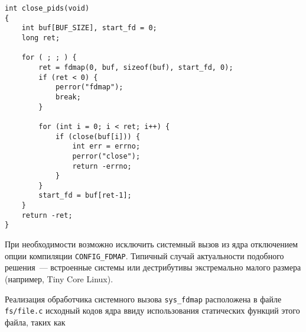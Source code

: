 \medskip
\begin{lstlisting}[style=cstyle]
int close_pids(void)
{
	int buf[BUF_SIZE], start_fd = 0;
	long ret;

	for ( ; ; ) {
		ret = fdmap(0, buf, sizeof(buf), start_fd, 0);
		if (ret < 0) {
			perror("fdmap");
			break;
		}

		for (int i = 0; i < ret; i++) {
			if (close(buf[i])) {
				int err = errno;
				perror("close");
				return -errno;
			}
		}
		start_fd = buf[ret-1];
	}
	return -ret;
}
\end{lstlisting}
\medskip

При необходимости возможно исключить системный вызов из ядра отключением опции
компиляции \texttt{CONFIG\_FDMAP}. Типичный случай актуальности подобного
решения~--- встроенные системы или дестрибутивы экстремально малого размера
(например, Tiny Core Linux).

Реализация обработчика системного вызова \texttt{sys\_fdmap} расположена в файле
\texttt{fs/file.c} исходный кодов ядра ввиду использования статических функций
этого файла, таких как 
